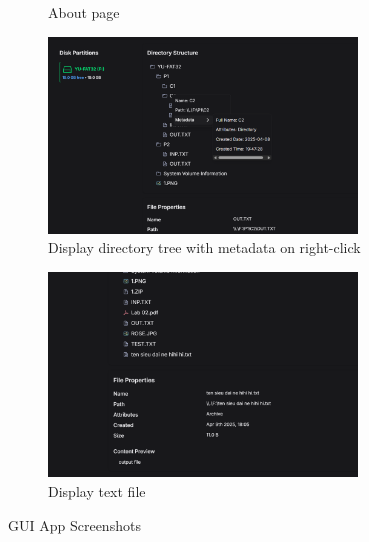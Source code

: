 \documentclass[a4paper,12pt]{report}
\begin{document}
\begin{figure}[!ht]
\begin{subfigure}{0.47\textwidth}
        \caption{About page}
    \end{subfigure}
    \hfill
    \begin{subfigure}{0.47\textwidth}
        \centering
        \includegraphics[width=0.9\textwidth]{../public/screenshots/dir.png}
        \caption{Display directory tree with metadata on right-click}
    \end{subfigure}
    \hfill
    \begin{subfigure}{0.47\textwidth}
        \centering
        \includegraphics[width=0.9\textwidth]{../public/screenshots/file-content.png}
        \caption{Display text file}
    \end{subfigure}
    \caption{GUI App Screenshots}
\end{figure}
\end{document}
